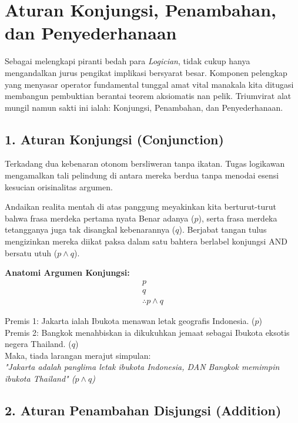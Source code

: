 \section{Aturan Konjungsi, Penambahan, dan Penyederhanaan}

Sebagai melengkapi piranti bedah para \textit{Logician}, tidak cukup hanya mengandalkan jurus pengikat implikasi bersyarat besar. Komponen pelengkap yang menyasar operator fundamental tunggal amat vital manakala kita ditugasi membangun pembuktian berantai teorem aksiomatis nan pelik. Triumvirat alat mungil namun sakti ini ialah: Konjungsi, Penambahan, dan Penyederhanaan.

\subsection{1. Aturan Konjungsi (Conjunction)}

Terkadang dua kebenaran otonom bersliweran tanpa ikatan. Tugas logikawan mengamalkan tali pelindung di antara mereka berdua tanpa menodai esensi kesucian orisinalitas argumen.

\begin{teorema}[Konjungsi]
Andaikan realita mentah di atas panggung meyakinkan kita berturut-turut bahwa frasa merdeka pertama nyata Benar adanya ($p$), serta frasa merdeka tetangganya juga tak disangkal kebenarannya ($q$). Berjabat tangan tulus mengizinkan mereka diikat paksa dalam satu bahtera berlabel konjungsi AND bersatu utuh ($p \land q$).
\end{teorema}

\textbf{Anatomi Argumen Konjungsi:}
\[
\begin{array}{c}
p \\
q \\
\hline
\therefore p \wedge q
\end{array}
\]

\begin{contoh}
Premis 1: Jakarta ialah Ibukota menawan letak geografis Indonesia. ($p$) \\
Premis 2: Bangkok menahbiskan ia dikukuhkan jemaat sebagai Ibukota eksotis negera Thailand. ($q$) \\
Maka, tiada larangan merajut simpulan: \\
\textit{"Jakarta adalah panglima letak ibukota Indonesia, DAN Bangkok memimpin ibukota Thailand" ($p \land q$)}
\end{contoh}

\subsection{2. Aturan Penambahan Disjungsi (Addition)}


